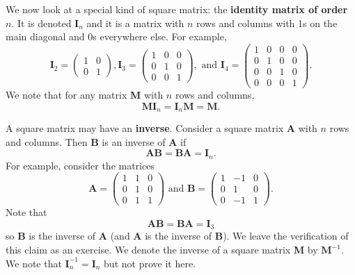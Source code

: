 We now look at a special kind of square matrix: the \textbf{identity matrix of order $n$}. It is denoted $\textbf{I}_n$ and it is a matrix with $n$ rows and columns with 1s on the main diagonal and 0s everywhere else. For example,
\[
    \textbf{I}_2 = \begin{pmatrix}1 & 0\\0 & 1\end{pmatrix},
\textbf{I}_3 = \begin{pmatrix}1 & 0 & 0\\0 & 1 & 0\\0 & 0 & 1\end{pmatrix}, \text{ and }
\textbf{I}_4 = \begin{pmatrix}1 & 0 & 0 & 0\\0 & 1 & 0 & 0\\0 & 0 & 1 & 0\\0 & 0 & 0 & 1\end{pmatrix}.
\]
We note that for any matrix \textbf{M} with $n$ rows and columns,
\[
    \textbf{MI}_n = \textbf{I}_n\textbf{M} = \textbf{M}.
\]

A square matrix may have an \textbf{inverse}. Consider a square matrix \textbf{A} with $n$ rows and columns. Then \textbf{B} is an inverse of \textbf{A} if
\[
    \textbf{AB} = \textbf{BA} = \textbf{I}_n.
\]
For example, consider the matrices
\[
    \textbf{A} = \begin{pmatrix}1&1&0\\ 0&1&0\\ 0&1&1\end{pmatrix} \text{ and } \textbf{B} = \begin{pmatrix}1&-1&0\\0&1&0\\0&-1&1\end{pmatrix}.
\]
Note that
\[
    \textbf{AB} = \textbf{BA} = \textbf{I}_3
\]
so \textbf{B} is the inverse of \textbf{A} (and \textbf{A} is the inverse of \textbf{B}). We leave the verification of this claim as an exercise. We denote the inverse of a square matrix \textbf{M} by $\textbf{M}^{-1}$. We note that $\textbf{I}_n^{-1} = \textbf{I}_n$ but not prove it here.

